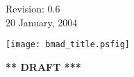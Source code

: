 \thispagestyle{empty}

\begin{flushright}
\large
  Revision: 0.6 \\
  20 January, 2004 \\
\end{flushright}

\vfill

{
\begin{center}
\texttt{[image: bmad\_title.psfig]} \\
\end{center}
}

\vskip 1in
\begin{center}
{\Huge \bf *** DRAFT ***}
\end{center}
\vfill
\break